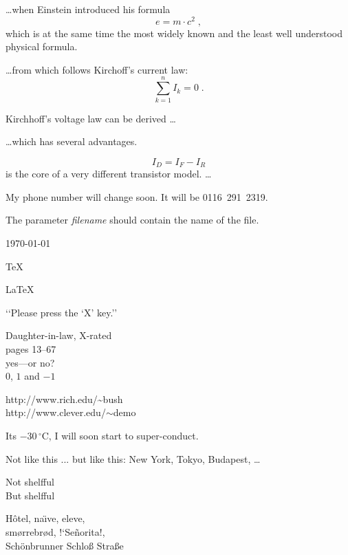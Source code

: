 \documentclass[a4paper,11pt]{article}
\begin{document}
\ldots when Einstein introduced his formula
\begin{equation}
e = m \cdot c^2 \; ,
\end{equation}
which is at the same time the most widely known
and the least well understood physical formula.



\ldots from which follows Kirchoff’s current law:
\begin{equation}
\sum_{k=1}^{n} I_k = 0 \; .
\end{equation}

Kirchhoff’s voltage law can be derived \ldots


\ldots which has several advantages.

\begin{equation}
I_D = I_F - I_R
\end{equation}
is the core of a very different transistor model. \ldots


My phone number will change soon.
It will be \mbox{0116 291 2319}.

The parameter \mbox{\emph{filename}} should
contain the name of the file.

\today

\TeX

\LaTeX

\LaTeXe

‘‘Please press the ‘X’ key.’’

Daughter-in-law, X-rated\\%
pages 13--67\\%
yes---or no?\\%
$0$, $1$ and $-1$%

http://www.rich.edu/\~{}bush \\
http://www.clever.edu/$\sim$demo

Its $-30\, ^{\circ}\mathrm{C}$,
I will soon start to
super-conduct.

Not like this ... but like this:
New York, Tokyo, Budapest, \ldots

Not%
shelfful\\
But%
shelf\mbox{}ful

H\^otel, na\"\i ve, \’el\‘eve,\\
sm\o rrebr\o d, !‘Se\~norita!,\\
Sch\"onbrunner Schlo\ss{}
Stra\ss e
\end{document}

